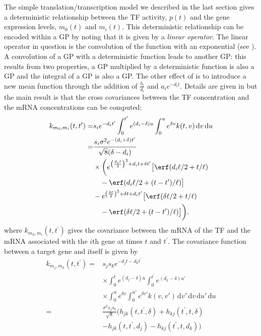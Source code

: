 \documentclass{article}
\begin{document}
The simple  translation/transcription model  we described in  the last
section gives  a deterministic  relationship between the  TF activity,
$p(t)$  and the gene  expression levels,  $m_0(t)$ and  $m_i(t)$. This
deterministic relationship can be encoded within a GP by
noting  that it  is  given  by a  \emph{linear  operator}. The  linear
operator  in question  is  the  convolution of  the  function with  an
exponential  (see  ).   A  convolution  of  a
GP  with  a  deterministic function  leads  to  another
GP: this results from two properties, a GP
multiplied by a deterministic function  is also a GP and
the integral  of a  GP is  also a GP. The
other effect  of  is to introduce  a new mean
function through  the addition  of $\frac{b_i}{d_i}$ and  $a_i e^{-d_i
  t}$.            Details            are           given            in
\cite{Lawrence:transcriptionalGP06,Gao:latent08,Honkela:modelbased10}
but  the main  result is  that the  cross covariances  between  the TF
concentration and the mRNA concentrations can be computed:
\begin{align*}
  k_{m_0, m_i}(t, t^\prime) = & s_i e^{-d_i t^\prime} \int_0^{t^\prime}
  e^{(d_i - \delta) u} \int_0^u e^{\delta v} k(t, v)\, \mathrm{d}v\, \mathrm{d}u \\
  = & \frac{s_i \sigma^2e^{-(d_i+\delta) t^\prime}}{\sqrt{8}(\delta - d_i)} \\
  &\times\bigg( e^{\left(\frac{d_i \ell}{2}\right)^2 + d_i t +
    \delta t^\prime }
  \big[\erf(d_i \ell / 2 + t/\ell) \\
  &\quad - \erf(d_i \ell / 2 + (t-t^\prime)/\ell)\big] \\
  &-e^{\left(\frac{\delta \ell}{2}\right)^2 + \delta t + d_i
    t^\prime} \big[\erf(\delta \ell / 2 + t/\ell) \\
  &\quad- \erf(\delta \ell / 2 +
  (t-t^\prime)/\ell)\big] \bigg).
\end{align*}
where $k_{m_0,m_i}(t, t^\prime)$ gives the covariance between the mRNA
of the TF and the mRNA associated with the $i$th gene at times $t$ and
$t^\prime$.  The covariance function between a target gene and itself is given by
\begin{align*}
  k_{m_j, m_k}(t, t^\prime) = &s_j s_k e^{-d_j t - d_k t^\prime}\\
  &\times\int_0^t e^{(d_j - \delta) u}
  \int_0^{t^\prime} e^{(d_k - \delta) u'} \\
  &\times
  \int_0^u e^{\delta v} \int_0^{u'} e^{\delta v'} k(v, v') \, \mathrm{d}v'\, \mathrm{d}v\, \mathrm{d}u'\, \mathrm{d}u \\
  = &\frac{\sigma^2 s_j s_k}{\sqrt{8}} \bigg(
  h_{jk}(t, t^\prime, \delta) + h_{kj}(t^\prime, t, \delta) \\
  &- h_{jk}(t, t^\prime, d_j) - h_{kj}(t^\prime, t, d_k)
  \bigg)
\end{align*}
\end{document}
